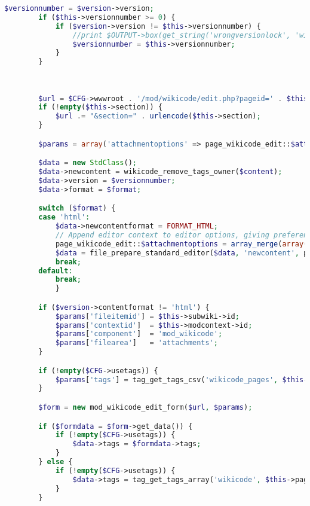 \begin{lstlisting}[language=PHP]
        $versionnumber = $version->version;
        if ($this->versionnumber >= 0) {
            if ($version->version != $this->versionnumber) {
                //print $OUTPUT->box(get_string('wrongversionlock', 'wikicode'), 'errorbox');
                $versionnumber = $this->versionnumber;
            }
        }
		
		

        $url = $CFG->wwwroot . '/mod/wikicode/edit.php?pageid=' . $this->page->id;
        if (!empty($this->section)) {
            $url .= "&section=" . urlencode($this->section);
        }

        $params = array('attachmentoptions' => page_wikicode_edit::$attachmentoptions, 'format' => $version->contentformat, 'version' => $versionnumber, 'pagetitle'=>$this->page->title);

        $data = new StdClass();
        $data->newcontent = wikicode_remove_tags_owner($content);
        $data->version = $versionnumber;
        $data->format = $format;

        switch ($format) {
        case 'html':
            $data->newcontentformat = FORMAT_HTML;
            // Append editor context to editor options, giving preference to existing context.
            page_wikicode_edit::$attachmentoptions = array_merge(array('context' => $this->modcontext), page_wikicode_edit::$attachmentoptions);
            $data = file_prepare_standard_editor($data, 'newcontent', page_wikicode_edit::$attachmentoptions, $this->modcontext, 'mod_wikicode', 'attachments', $this->subwiki->id);
            break;
        default:
            break;
            }

        if ($version->contentformat != 'html') {
            $params['fileitemid'] = $this->subwiki->id;
            $params['contextid']  = $this->modcontext->id;
            $params['component']  = 'mod_wikicode';
            $params['filearea']   = 'attachments';
        }

        if (!empty($CFG->usetags)) {
            $params['tags'] = tag_get_tags_csv('wikicode_pages', $this->page->id, TAG_RETURN_TEXT);
        }

        $form = new mod_wikicode_edit_form($url, $params);

        if ($formdata = $form->get_data()) {
            if (!empty($CFG->usetags)) {
                $data->tags = $formdata->tags;
            }
        } else {
            if (!empty($CFG->usetags)) {
                $data->tags = tag_get_tags_array('wikicode', $this->page->id);
            }
        }
		

\end{lstlisting}
